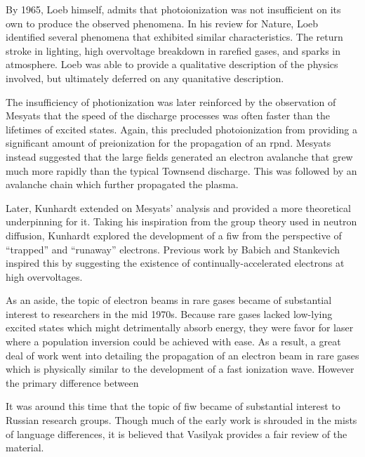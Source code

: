 By 1965, Loeb himself, admits that photoionization was not insufficient on its
own to produce the observed phenomena. In his review for Nature, Loeb
identified several phenomena that exhibited similar characteristics. The
return stroke in lighting, high overvoltage breakdown in rarefied gases, and
sparks in atmosphere. Loeb was able to provide a qualitative description of the
physics involved, but ultimately deferred on any quanitative description.

The insufficiency of photionization was later reinforced by the observation of
Mesyats \cite{Mesyats1972} that the speed of the discharge processes was often
faster than the lifetimes of excited states. Again, this precluded
photoionization from providing a significant amount of preionization for the
propagation of an rpnd. Mesyats instead suggested that the large fields
generated an electron avalanche that grew much more rapidly than the typical
Townsend discharge. This was followed by an avalanche chain which further
propagated the plasma.

Later, Kunhardt \cite{Kunhardt1980} extended on Mesyats' analysis and provided a
more theoretical underpinning for it. Taking his inspiration from the group
theory used in neutron diffusion, Kunhardt explored the development of a fiw
from the perspective of ``trapped'' and ``runaway'' electrons. Previous work by
Babich and Stankevich \cite{Babich1973} inspired this by suggesting the
existence of continually-accelerated electrons at high overvoltages.

As an aside, the topic of electron beams in rare gases became of substantial
interest to researchers in the mid 1970s. Because rare gases lacked low-lying
excited states which might detrimentally absorb energy, they were favor for
laser where a population inversion could be achieved with ease. As a result, a
great deal of work went into detailing the propagation of an electron beam in
rare gases which is physically similar to the development of a fast ionization
wave. However the primary difference between

It was around this time that the topic of fiw became of substantial interest to
Russian research groups. Though much of the early work is shrouded in the mists
of language differences, it is believed that Vasilyak \cite{Vasilyak1994}
provides a fair review of the material. 


